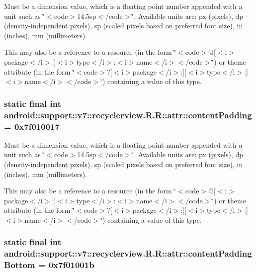 Must be a dimension value, which is a floating point number appended with a unit such as \char`\"{}$<$code$>$14.5sp$<$/code$>$\char`\"{}. Available units are: px (pixels), dp (density-independent pixels), sp (scaled pixels based on preferred font size), in (inches), mm (millimeters). 

This may also be a reference to a resource (in the form \char`\"{}$<$code$>$@\mbox{[}$<$i$>$package$<$/i$>$:\mbox{]}$<$i$>$type$<$/i$>$:$<$i$>$name$<$/i$>$$<$/code$>$\char`\"{}) or theme attribute (in the form \char`\"{}$<$code$>$?\mbox{[}$<$i$>$package$<$/i$>$:\mbox{]}\mbox{[}$<$i$>$type$<$/i$>$:\mbox{]}$<$i$>$name$<$/i$>$$<$/code$>$\char`\"{}) containing a value of this type. \hypertarget{classandroid_1_1support_1_1v7_1_1recyclerview_1_1_r_1_1attr_a9cd3c692ef756e33f9256379f080dcd}{
\subsubsection[{contentPadding}]{\setlength{\rightskip}{0pt plus 5cm}static final int android::support::v7::recyclerview.R.R::attr::contentPadding = 0x7f010017}}
\label{classandroid_1_1support_1_1v7_1_1recyclerview_1_1_r_1_1attr_a9cd3c692ef756e33f9256379f080dcd}


Must be a dimension value, which is a floating point number appended with a unit such as \char`\"{}$<$code$>$14.5sp$<$/code$>$\char`\"{}. Available units are: px (pixels), dp (density-independent pixels), sp (scaled pixels based on preferred font size), in (inches), mm (millimeters). 

This may also be a reference to a resource (in the form \char`\"{}$<$code$>$@\mbox{[}$<$i$>$package$<$/i$>$:\mbox{]}$<$i$>$type$<$/i$>$:$<$i$>$name$<$/i$>$$<$/code$>$\char`\"{}) or theme attribute (in the form \char`\"{}$<$code$>$?\mbox{[}$<$i$>$package$<$/i$>$:\mbox{]}\mbox{[}$<$i$>$type$<$/i$>$:\mbox{]}$<$i$>$name$<$/i$>$$<$/code$>$\char`\"{}) containing a value of this type. \hypertarget{classandroid_1_1support_1_1v7_1_1recyclerview_1_1_r_1_1attr_d628484b715dd9e5aea7b4bc9b6c1ab6}{
\subsubsection[{contentPaddingBottom}]{\setlength{\rightskip}{0pt plus 5cm}static final int android::support::v7::recyclerview.R.R::attr::contentPaddingBottom = 0x7f01001b}}
\label{classandroid_1_1support_1_1v7_1_1recyclerview_1_1_r_1_1attr_d628484b715dd9e5aea7b4bc9b6c1ab6}


